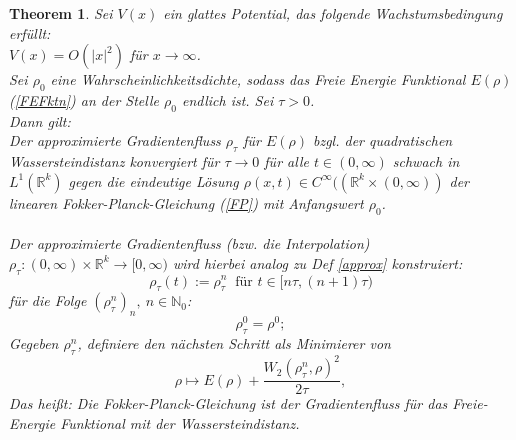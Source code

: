 \documentclass[11pt,a4paper,notitlepage]{scrreprt}
\newcommand{\RR}{\mathbb{R}}
\newcommand{\NN}{\mathbb{N}}
\newtheorem{theorem}[defi]{Theorem}
\begin{document}
\begin{theorem}
Sei $V(x)$ ein glattes Potential, das folgende Wachstumsbedingung erfüllt: \\$V(x)=O(\vert x \vert^2)$ für $x\to\infty$. \\
Sei $\rho_0$ eine Wahrscheinlichkeitsdichte, sodass das Freie Energie Funktional $E(\rho)$ (\ref{FEFktn}) an der Stelle $\rho_0$ endlich ist. Sei $\tau>0$.\\
Dann gilt: \\
Der approximierte Gradientenfluss $\rho_\tau$  für $E(\rho)$ bzgl. der quadratischen Wassersteindistanz konvergiert für $\tau\to 0$ für alle $t\in(0,\infty)$ schwach in $L^1(\RR^k)$ gegen die eindeutige Lösung $\rho(x,t)\in C^\infty((\RR^k\times(0,\infty))$ der linearen Fokker-Planck-Gleichung (\ref{FP}) mit Anfangswert $\rho_0$.\\\\
Der approximierte Gradientenfluss (bzw. die Interpolation) $\rho_\tau:(0,\infty)\times\RR^k\to[0,\infty)$ wird hierbei analog zu Def \ref{approx} konstruiert:
\begin{equation}
\rho_\tau(t):=\rho_\tau^n ~\text{ für }t\in[n\tau,(n+1)\tau)
\end{equation}
für die Folge $(\rho_\tau^n)_n,~n\in\NN_0$:
\[\rho_\tau^0=\rho^0; \]
Gegeben $\rho_\tau^n$, definiere den nächsten Schritt als Minimierer von
\begin{equation} \rho \mapsto E(\rho)+\dfrac{W_2(\rho_\tau^n,\rho)^2}{2\tau}, \label{rho^n}
\end{equation}
Das heißt: Die Fokker-Planck-Gleichung ist der Gradientenfluss für das Freie-Energie Funktional mit der Wassersteindistanz.
\end{theorem}
\end{document}

